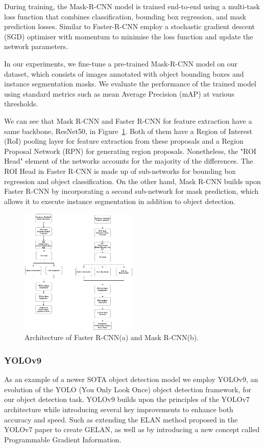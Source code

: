 \documentclass{IEEEtran}
\begin{document}
	During training, the Mask-R-CNN model is trained end-to-end using a multi-task loss function that combines classification, bounding box regression, and mask prediction losses. Similar to Faster-R-CNN employ a stochastic gradient descent (SGD) optimiser with momentum to minimise the loss function and update the network parameters.
	
	In our experiments, we fine-tune a pre-trained Mask-R-CNN model on our dataset, which consists of images annotated with object bounding boxes and instance segmentation masks. We evaluate the performance of the trained model using standard metrics such as mean Average Precision (mAP) at various thresholds.
	
	We can see that Mask R-CNN and Faster R-CNN for feature extraction have a same backbone, ResNet50, in Figure~\ref{fig:faster_mask_rcnn}. Both of them have a Region of Interest (RoI) pooling layer for feature extraction from these proposals and a Region Proposal Network (RPN) for generating region proposals. Nonetheless, the "ROI Head" element of the networks accounts for the majority of the differences. The ROI Head in Faster R-CNN is made up of sub-networks for bounding box regression and object classification. On the other hand, Mask R-CNN builds upon Faster R-CNN by incorporating a second sub-network for mask prediction, which allows it to execute instance segmentation in addition to object detection. 


	
	\begin{figure}[htbp]
		\centering
		\includegraphics[width=0.5\textwidth]{images/faster_mask_rcnn.png}
		\caption{Architecture of Faster R-CNN(a) and Mask R-CNN(b).}
		\label{fig:faster_mask_rcnn}
	\end{figure}
	
	
	\subsubsection{YOLOv9}
	As an example of a newer SOTA object detection model we employ YOLOv9, an evolution of the YOLO (You Only Look Once) object detection framework, for our object detection task. YOLOv9 builds upon the principles of the YOLOv7 architecture while introducing several key improvements to enhance both accuracy and speed. Such as extending the ELAN method proposed in the YOLOv7 paper to create GELAN, as well as by introducing a new concept called Programmable Gradient Information.
	
\end{document}
